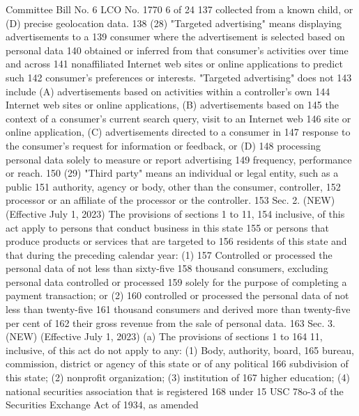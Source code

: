 Committee Bill No. 6
LCO No. 1770 6 of 24
137 collected from a known child, or (D) precise geolocation data.
138 (28) "Targeted advertising" means displaying advertisements to a
139 consumer where the advertisement is selected based on personal data
140 obtained or inferred from that consumer's activities over time and across
141 nonaffiliated Internet web sites or online applications to predict such
142 consumer's preferences or interests. "Targeted advertising" does not
143 include (A) advertisements based on activities within a controller's own
144 Internet web sites or online applications, (B) advertisements based on
145 the context of a consumer's current search query, visit to an Internet web
146 site or online application, (C) advertisements directed to a consumer in
147 response to the consumer's request for information or feedback, or (D)
148 processing personal data solely to measure or report advertising
149 frequency, performance or reach.
150 (29) "Third party" means an individual or legal entity, such as a public
151 authority, agency or body, other than the consumer, controller,
152 processor or an affiliate of the processor or the controller.
153 Sec. 2. (NEW) (Effective July 1, 2023) The provisions of sections 1 to 11,
154 inclusive, of this act apply to persons that conduct business in this state
155 or persons that produce products or services that are targeted to
156 residents of this state and that during the preceding calendar year: (1)
157 Controlled or processed the personal data of not less than sixty-five
158 thousand consumers, excluding personal data controlled or processed
159 solely for the purpose of completing a payment transaction; or (2)
160 controlled or processed the personal data of not less than twenty-five
161 thousand consumers and derived more than twenty-five per cent of
162 their gross revenue from the sale of personal data.
163 Sec. 3. (NEW) (Effective July 1, 2023) (a) The provisions of sections 1 to
164 11, inclusive, of this act do not apply to any: (1) Body, authority, board,
165 bureau, commission, district or agency of this state or of any political
166 subdivision of this state; (2) nonprofit organization; (3) institution of
167 higher education; (4) national securities association that is registered
168 under 15 USC 78o-3 of the Securities Exchange Act of 1934, as amended 


